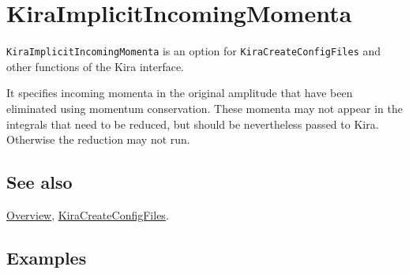 \documentclass[../FeynHelpersManual.tex]{subfiles}
\begin{document}
\begin{Shaded}
\begin{Highlighting}[]
 
\end{Highlighting}
\end{Shaded}

\hypertarget{kiraimplicitincomingmomenta}{
\section{KiraImplicitIncomingMomenta}\label{kiraimplicitincomingmomenta}}

\texttt{KiraImplicitIncomingMomenta} is an option for
\texttt{KiraCreateConfigFiles} and other functions of the Kira
interface.

It specifies incoming momenta in the original amplitude that have been
eliminated using momentum conservation. These momenta may not appear in
the integrals that need to be reduced, but should be nevertheless passed
to Kira. Otherwise the reduction may not run.

\subsection{See also}

\hyperlink{toc}{Overview},
\hyperlink{kiracreateconfigfiles}{KiraCreateConfigFiles}.

\subsection{Examples}
\end{document}
